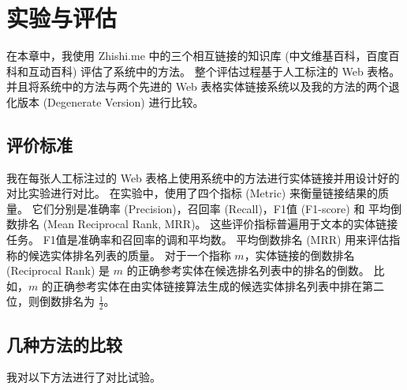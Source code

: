 \chapter{实验与评估}
在本章中，我使用 Zhishi.me 中的三个相互链接的知识库 (中文维基百科，百度百科和互动百科) 评估了系统中的方法。
整个评估过程基于人工标注的 Web 表格。
并且将系统中的方法与两个先进的 Web 表格实体链接系统以及我的方法的两个退化版本 (Degenerate Version) 进行比较。

\section{评价标准}
我在每张人工标注过的 Web 表格上使用系统中的方法进行实体链接并用设计好的对比实验进行对比。
在实验中，使用了四个指标 (Metric) 来衡量链接结果的质量。
它们分别是准确率 (Precision)，召回率 (Recall)，F1值 (F1-score) 和 平均倒数排名 (Mean Reciprocal Rank\cite{craswell2009mean}, MRR)。
这些评价指标普遍用于文本的实体链接任务\cite{bhagavatula2015tabel}。
F1值是准确率和召回率的调和平均数。
平均倒数排名 (MRR) 用来评估指称的候选实体排名列表的质量。
对于一个指称 $m$，实体链接的倒数排名 (Reciprocal Rank) 是 $m$ 的正确参考实体在候选排名列表中的排名的倒数。
比如，$m$ 的正确参考实体在由实体链接算法生成的候选实体排名列表中排在第二位，则倒数排名为 $\frac{1}{2}$。


\section{几种方法的比较}
我对以下方法进行了对比试验。

